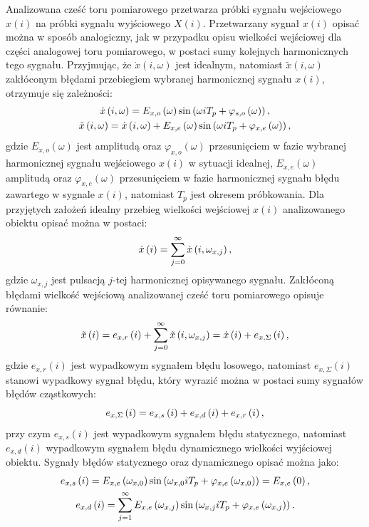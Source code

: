 Analizowana cześć toru pomiarowego przetwarza próbki sygnału wejściowego $x(i)$ na próbki sygnału wyjściowego $X(i)$. Przetwarzany sygnał $x(i)$ opisać można w sposób analogiczny, jak w przypadku opisu wielkości wejściowej dla części analogowej toru pomiarowego, w postaci sumy kolejnych harmonicznych tego sygnału. Przyjmując, że $\dot{x}(i, \omega)$ jest idealnym, natomiast $\tilde{x}(i, \omega)$ zakłóconym błędami przebiegiem wybranej harmonicznej sygnału $x(i)$, otrzymuje się zależności:
\begin{gather}
\dot{x} \left( i, \omega \right) = E_{x,o} \left(\omega\right) \sin \left( \omega iT_{p} + \varphi_{s,o} \left(\omega\right) \right) \label{eq:in_disc_omega_ideal}, \\
\tilde{x} \left( i, \omega \right) = \dot{x} \left( i, \omega \right) + E_{x,e} \left(\omega\right) \sin \left( \omega iT_{p} + \varphi_{x,e} \left(\omega\right) \right) \label{eq:in_disc_omega_real},
\end{gather}
gdzie $E_{x,o}(\omega)$ jest amplitudą oraz $\varphi_{x,o}(\omega)$ przesunięciem w fazie wybranej harmonicznej sygnału wejściowego $x(i)$ w sytuacji idealnej, $E_{x,e}(\omega)$ amplitudą oraz $\varphi_{x,e}(\omega)$ przesunięciem w fazie harmonicznej sygnału błędu zawartego w sygnale $x(i)$, natomiast $T_{p}$ jest okresem próbkowania. Dla przyjętych założeń idealny przebieg wielkości wejściowej $x(i)$ analizowanego obiektu opisać można w postaci:
\begin{equation}
\dot{x} \left(i\right) = \sum _{j = 0} ^{\infty} \dot{x} \left( i, \omega_{x,j} \right) \label{eq:in_disc_sum},
\end{equation}
gdzie $\omega_{x,j}$ jest pulsacją $j$-tej harmonicznej opisywanego sygnału. Zakłóconą błędami wielkość wejściową analizowanej cześć toru pomiarowego opisuje równanie:
\begin{equation}
\tilde{x} \left(i\right) = e_{x,r} \left(i\right) + \sum _{j = 0} ^{\infty} \tilde{x} \left( i, \omega_{x,j} \right) = \dot{x} \left(i\right) + e_{x,\Sigma} \left(i\right) \label{eq:in_disc_real},
\end{equation}
gdzie $e_{x,r}(i)$ jest wypadkowym sygnałem błędu losowego, natomiast $e_{x,\Sigma}(i)$ stanowi wypadkowy sygnał błędu, który wyrazić można w postaci sumy sygnałów błędów cząstkowych:
\begin{equation}
e_{x,\Sigma} \left(i\right) = e_{x,s} \left(i\right) + e_{x,d} \left(i\right) + e_{x,r} \left(i\right) \label{eq:in_disc_err_sum},
\end{equation}
przy czym $e_{x,s}(i)$ jest wypadkowym sygnałem błędu statycznego, natomiast $e_{x,d}(i)$ wypadkowym sygnałem błędu dynamicznego wielkości wyjściowej obiektu. Sygnały błędów statycznego oraz dynamicznego opisać można jako:
\begin{gather}
e_{x,s} \left(i\right) = E_{x,e} \left(\omega_{x,0}\right) \sin \left( \omega_{x,0} iT_{p} + \varphi_{x,e} \left(\omega_{x,0}\right) \right) = E_{x,e} \left(0\right) \label{eq:in_disc_err_stat}, \\
e_{x,d} \left(i\right) = \sum _{j = 1} ^{\infty} E_{x,e} \left(\omega_{x,j}\right) \sin \left( \omega_{x,j} iT_{p} + \varphi_{x,e} \left(\omega_{x,j}\right) \right) \label{eq:in_disc_err_dyn}.
\end{gather}

